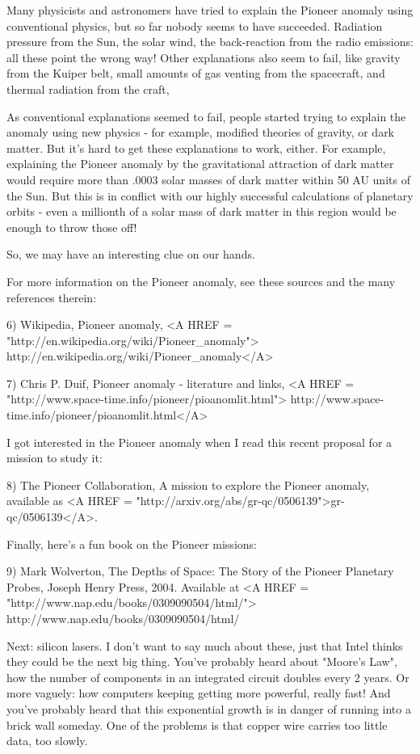 Many physicists and astronomers have tried to explain the Pioneer anomaly using 
conventional physics, but so far nobody seems to have succeeded.  Radiation
pressure from the Sun, the solar wind, the back-reaction from the radio emissions:
all these point the wrong way!  Other explanations also seem to fail, like 
gravity from the Kuiper belt, small amounts of gas venting from the spacecraft, 
and thermal radiation from the craft, 

As conventional explanations seemed to fail, people started trying to explain the 
anomaly using new physics - for example, modified theories of gravity, or dark 
matter.  But it's hard to get these explanations to work, either.  For example, 
explaining the Pioneer anomaly by the gravitational attraction of dark matter 
would require more than .0003 solar masses of dark matter within 50 AU units of 
the Sun.  But this is in conflict with our highly successful calculations of 
planetary orbits - even a millionth of a solar mass of dark matter in this region 
would be enough to throw those off!

So, we may have an interesting clue on our hands.

For more information on the Pioneer anomaly, see these sources and the many 
references therein:

6) Wikipedia, Pioneer anomaly, <A HREF = "http://en.wikipedia.org/wiki/Pioneer_anomaly">
http://en.wikipedia.org/wiki/Pioneer_anomaly</A> 

7) Chris P. Duif, Pioneer anomaly - literature and links, 
   <A HREF = "http://www.space-time.info/pioneer/pioanomlit.html">
http://www.space-time.info/pioneer/pioanomlit.html</A>

I got interested in the Pioneer anomaly when I read this recent proposal
for a mission to study it:

8) The Pioneer Collaboration, A mission to explore the Pioneer anomaly,
   available as
   <A HREF = "http://arxiv.org/abs/gr-qc/0506139">gr-qc/0506139</A>.

Finally, here's a fun book on the Pioneer missions:

9) Mark Wolverton, The Depths of Space: The Story of the Pioneer Planetary 
   Probes, Joseph Henry Press, 2004.  Available at 
   <A HREF = "http://www.nap.edu/books/0309090504/html/">
   http://www.nap.edu/books/0309090504/html/

Next: silicon lasers.  I don't want to say much about these, just that Intel
thinks they could be the next big thing.  You've probably heard about 
"Moore's Law", 
how the number of components in an integrated circuit doubles every 2 
years.   Or more vaguely: how computers keeping getting more powerful, really
fast!  And you've probably heard that this exponential growth is in danger of 
running into a brick wall someday.  One of the problems is that copper wire 
carries too little data, too slowly.  

